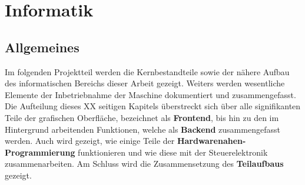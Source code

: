 \chapter{Informatik}\label{ch:informatik}

\section{Allgemeines}\label{sec:einleitung}
Im folgenden Projektteil werden die Kernbestandteile sowie der nähere Aufbau des informatischen Bereichs dieser Arbeit gezeigt.
Weiters werden wesentliche Elemente der Inbetriebnahme der Maschine dokumentiert und zusammengefasst.
Die Aufteilung dieses XX seitigen Kapitels überstreckt sich über alle signifikanten Teile der grafischen Oberfläche, bezeichnet als \textbf{Frontend}, bis hin zu den im Hintergrund arbeitenden Funktionen, welche als \textbf{Backend} zusammengefasst werden.
Auch wird gezeigt, wie einige Teile der \textbf{Hardwarenahen-Programmierung} funktionieren und wie diese mit der Steuerelektronik zusammenarbeiten.
Am Schluss wird die Zusammensetzung des \textbf{Teilaufbaus} gezeigt.

